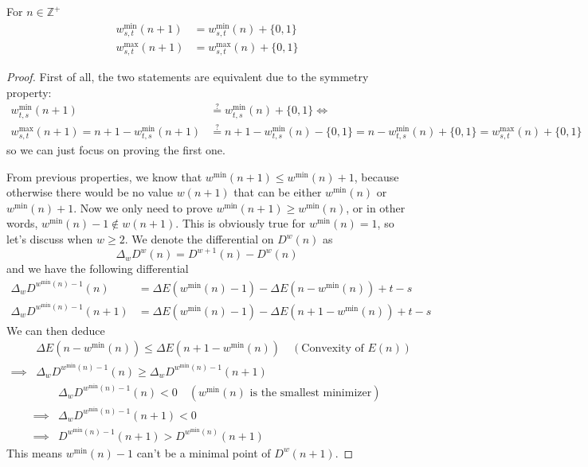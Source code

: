 \documentclass[]{article}
\begin{document}
\vspace{1cm}
\begin{lemma}
	For $n \in \mathbb{Z}^+$
\begin{align*}
w^{\min}_{s,t}(n+1) &= w^{\min}_{s,t}(n)+ \{0, 1\}\\
w^{\max}_{s,t}(n+1) &= w^{\max}_{s,t}(n)+ \{0, 1\}
\end{align*}
\end{lemma}
\begin{proof}
	First of all, the two statements are equivalent due to the symmetry property:
	\begin{align*}
	w^{\min}_{t,s}(n+1) &\stackrel{?}{=} w^{\min}_{t,s}(n)+ \{0, 1\} \iff \\ 
	w^{\max}_{s,t}(n+1) = n+1 - w^{\min}_{t,s}(n+1) &\stackrel{?}{=}  n+1 - w^{\min}_{t,s}(n) - \{0, 1\} =  n- w^{\min}_{t,s}(n) + \{0, 1\} =  w^{\max}_{s,t}(n) + \{0, 1\}
	\end{align*}
	so we can just focus on proving the first one. 
	
	From previous properties, we know that $w^{\min}(n+1) \leq w^{\min}(n) + 1$, because otherwise there would be no value $w(n+1)$ that can be either $w^{\min}(n)$ or $w^{\min}(n) + 1$. Now we only need to prove $w^{\min}(n+1)\geq w^{\min}(n)$, or in other words, $w^{\min}(n) - 1 \notin w(n+1)$. This is obviously true for $w^{\min}(n) = 1$, so let's discuss when $w \geq 2$. We denote the differential on $D^w(n)$ as 
	\[
	\Delta_w D^w(n) = D^{w+1}(n) - D^w(n)
	\]
	and we have the following differential
	\begin{align*}
	\Delta_w D^{w^{\min}(n)-1}(n) &= \Delta E(w^{\min}(n)-1) - \Delta E(n-w^{\min}(n)) + t - s\\
	\Delta_w D^{w^{\min}(n)-1}(n+1) &= \Delta E(w^{\min}(n)-1) - \Delta E(n+1-w^{\min}(n)) + t - s
	\end{align*}
	We can then deduce
	\begin{align*}
	&\Delta E(n-w^{\min}(n))\leq \Delta E(n+1-w^{\min}(n)) \quad(\text{Convexity of $E(n)$}) \\
	\implies &\Delta_w D^{w^{\min}(n)-1}(n)\geq\Delta_w D^{w^{\min}(n)-1}(n+1)
	\end{align*}
	\begin{align*}
	&\Delta_w D^{w^{\min}(n)-1}(n) < 0 \quad(\text{$w^{\min}(n)$ is the smallest minimizer})\\
	\implies &\Delta_w D^{w^{\min}(n)-1}(n+1) < 0 \\
	\implies & D^{w^{\min}(n)-1}(n+1) > D^{w^{\min}(n)}(n+1)
	\end{align*}
	This means $w^{\min}(n) -1$ can't be a minimal point of $D^{w}(n+1)$.
\end{proof}
\end{document}
